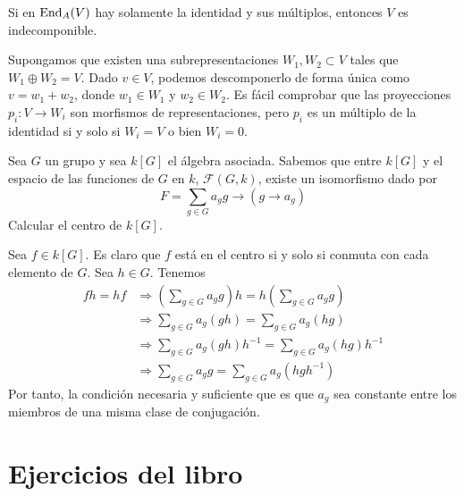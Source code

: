 \documentclass[twoside]{article}
\begin{document}
\begin{ejercicio}{3}
Si en $\operatorname{End}_A(V)$ hay solamente la identidad y sus múltiplos, entonces $V$ es indecomponible.
\end{ejercicio}
\begin{solucion}
Supongamos que existen una subrepresentaciones $W_1,W_2\subset V$ tales que $W_1\oplus W_2= V$. Dado $v\in V$, podemos descomponerlo de forma única como $v=w_1+w_2$, donde $w_1\in W_1$ y $w_2\in W_2$. Es fácil comprobar que las proyecciones $p_i:V\to W_i$ son morfismos de representaciones, pero $p_i$ es un múltiplo de la identidad si y solo si $W_i=V$ o bien $W_i=0$. 
\end{solucion}
\newpage
\begin{ejercicio}{4}
Sea $G$ un grupo y sea $k[G]$ el álgebra asociada. Sabemos que entre $k[G]$ y el espacio de las funciones de $G$ en $k$, $\mathcal{F}(G,k)$, existe un isomorfismo dado por
$$
F = \sum_{g\in G} a_g g \to (g\to a_g)
$$
Calcular el centro de $k[G]$.
\end{ejercicio}
\begin{solucion}
Sea $f\in k[G]$. Es claro que $f$ está en el centro si y solo si conmuta con cada elemento de $G$. Sea $h\in G$. Tenemos
\begin{align*}
fh =  hf &\Longrightarrow \left(\sum_{g\in G} a_g g \right)h = h\left(\sum_{g\in G} a_g g \right)\\
&\Longrightarrow \sum_{g \in G} a_g (gh) = \sum_{g \in G} a_g (hg) \\
&\Longrightarrow \sum_{g \in G} a_g (gh)h^{-1} = \sum_{g \in G} a_g (hg) h^{-1}\\
&\Longrightarrow \sum_{g \in G} a_g g = \sum_{g \in G} a_g (hgh^{-1}) 
\end{align*}
Por tanto, la condición necesaria y suficiente que es que $a_g$ sea constante entre los miembros de una misma clase de conjugación.
\end{solucion}
\newpage

\section{Ejercicios del libro}
\end{document}
